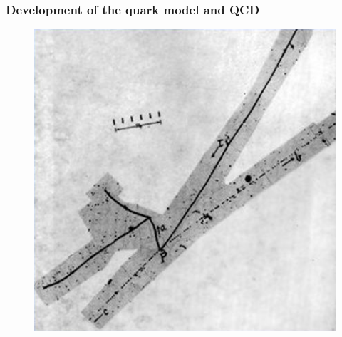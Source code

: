 	\subsubsection*{Development of the quark model and \acl{QCD}}
	\label{chapt2:sssec:quark}
	
\begingroup\setlength{\intextsep}{0pt}\setlength{\columnsep}{15pt}
	
	\begin{figure}
		\begin{minipage}{\linewidth}
			\centering\captionsetup[subfigure]{justification=centering}
			\includegraphics[width=.8\linewidth]{fig/chapt2/mu-meson.png}
			\subcaption{\label{fig:emulsions:A}}

\end{minipage}
\end{figure}
